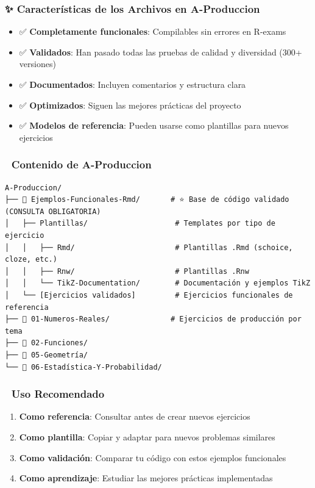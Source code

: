 \documentclass[
]{article}
\providecommand{\tightlist}{%
  \setlength{\itemsep}{0pt}\setlength{\parskip}{0pt}}
\begin{document}
\subsubsection{\texorpdfstring{✨ \textbf{Características de los
Archivos en
A-Produccion}}{✨ Características de los Archivos en A-Produccion}}\label{caracteruxedsticas-de-los-archivos-en-a-produccion}

\begin{itemize}
\tightlist
\item
  ✅ \textbf{Completamente funcionales}: Compilables sin errores en
  R-exams
\item
  ✅ \textbf{Validados}: Han pasado todas las pruebas de calidad y
  diversidad (300+ versiones)
\item
  ✅ \textbf{Documentados}: Incluyen comentarios y estructura clara
\item
  ✅ \textbf{Optimizados}: Siguen las mejores prácticas del proyecto
\item
  ✅ \textbf{Modelos de referencia}: Pueden usarse como plantillas para
  nuevos ejercicios
\end{itemize}

\subsubsection{\texorpdfstring{📂 \textbf{Contenido de
A-Produccion}}{📂 Contenido de A-Produccion}}\label{contenido-de-a-produccion}

\begin{verbatim}
A-Produccion/
├── 📂 Ejemplos-Funcionales-Rmd/       # ⭐ Base de código validado (CONSULTA OBLIGATORIA)
│   ├── Plantillas/                    # Templates por tipo de ejercicio
│   │   ├── Rmd/                       # Plantillas .Rmd (schoice, cloze, etc.)
│   │   ├── Rnw/                       # Plantillas .Rnw
│   │   └── TikZ-Documentation/        # Documentación y ejemplos TikZ
│   └── [Ejercicios validados]         # Ejercicios funcionales de referencia
├── 📂 01-Numeros-Reales/              # Ejercicios de producción por tema
├── 📂 02-Funciones/
├── 📂 05-Geometría/
└── 📂 06-Estadística-Y-Probabilidad/
\end{verbatim}

\subsubsection{\texorpdfstring{🎯 \textbf{Uso
Recomendado}}{🎯 Uso Recomendado}}\label{uso-recomendado}

\begin{enumerate}
\def\labelenumi{\arabic{enumi}.}
\tightlist
\item
  \textbf{Como referencia}: Consultar antes de crear nuevos ejercicios
\item
  \textbf{Como plantilla}: Copiar y adaptar para nuevos problemas
  similares
\item
  \textbf{Como validación}: Comparar tu código con estos ejemplos
  funcionales
\item
  \textbf{Como aprendizaje}: Estudiar las mejores prácticas
  implementadas
\end{enumerate}
\end{document}

